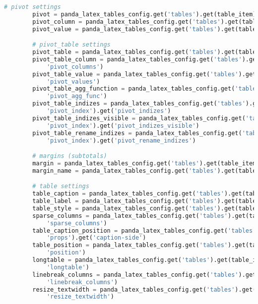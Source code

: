 \begin{lstlisting}[language=python, caption=Python LaTex - pandas\_dataframe\_to\_latex\_table.py CSV - LaTex Tabelle,captionpos=b,label={lst:Python LaTex - pandas_dataframe_to_latex_table},breaklines=true]
        # pivot settings
        pivot = panda_latex_tables_config.get('tables').get(table_item).get('pivot')
        pivot_column = panda_latex_tables_config.get('tables').get(table_item).get('pivot_columns')
        pivot_value = panda_latex_tables_config.get('tables').get(table_item).get('pivot_values')

        # pivot_table settings
        pivot_table = panda_latex_tables_config.get('tables').get(table_item).get('pivot_table')
        pivot_table_column = panda_latex_tables_config.get('tables').get(table_item).get('pivot_table').get(
            'pivot_columns')
        pivot_table_value = panda_latex_tables_config.get('tables').get(table_item).get('pivot_table').get(
            'pivot_values')
        pivot_table_agg_function = panda_latex_tables_config.get('tables').get(table_item).get('pivot_table').get(
            'pivot_agg_func')
        pivot_table_indizes = panda_latex_tables_config.get('tables').get(table_item).get('pivot_table').get(
            'pivot_index').get('pivot_indizes')
        pivot_table_indizes_visible = panda_latex_tables_config.get('tables').get(table_item).get('pivot_table').get(
            'pivot_index').get('pivot_indizes_visible')
        pivot_table_rename_indizes = panda_latex_tables_config.get('tables').get(table_item).get('pivot_table').get(
            'pivot_index').get('pivot_rename_indizes')

        # margins (subtotals)
        margin = panda_latex_tables_config.get('tables').get(table_item).get('margins').get('margin')
        margin_name = panda_latex_tables_config.get('tables').get(table_item).get('margins').get('margin_name')

        # table settings
        table_caption = panda_latex_tables_config.get('tables').get(table_item).get('caption')
        table_label = panda_latex_tables_config.get('tables').get(table_item).get('label')
        table_style = panda_latex_tables_config.get('tables').get(table_item).get('table_styles')
        sparse_columns = panda_latex_tables_config.get('tables').get(table_item).get('table_styles').get(
            'sparse_columns')
        table_caption_position = panda_latex_tables_config.get('tables').get(table_item).get('table_styles').get(
            'props').get('caption-side')
        table_position = panda_latex_tables_config.get('tables').get(table_item).get('table_styles').get('props').get(
            'position')
        longtable = panda_latex_tables_config.get('tables').get(table_item).get('table_styles').get('props').get(
            'longtable')
        linebreak_columns = panda_latex_tables_config.get('tables').get(table_item).get('table_styles').get('props').get(
            'linebreak_columns')
        resize_textwidth = panda_latex_tables_config.get('tables').get(table_item).get('table_styles').get('props').get(
            'resize_textwidth')


\end{lstlisting}
